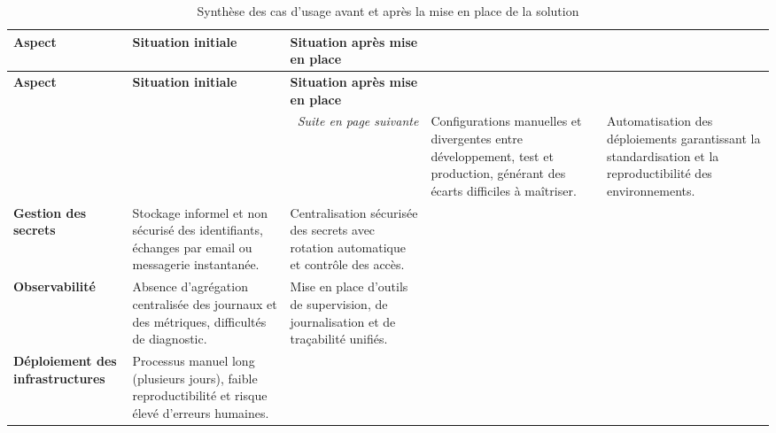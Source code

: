 \begin{longtable}{|p{5cm}|p{5cm}|p{5cm}|}
	\caption{Synthèse des cas d'usage avant et après la mise en place de la solution} \label{tab:avant_apres}                                                                                           \\
	\hline
	\textbf{Aspect}                                                                                                              & \textbf{Situation initiale} & \textbf{Situation après mise en place} \\
	\hline
	\endfirsthead
	\hline
	\textbf{Aspect}                                                                                                              & \textbf{Situation initiale} & \textbf{Situation après mise en place} \\
	\hline
	\endhead
	\hline
	\multicolumn{3}{r}{\textit{Suite en page suivante}}
	\endfoot
	\hline
	\endlastfoot
	\textbf{Cohérence des environnements}                                                                                        &
	Configurations manuelles et divergentes entre développement, test et production, générant des écarts difficiles à maîtriser. &
	Automatisation des déploiements garantissant la standardisation et la reproductibilité des environnements.                                                                                          \\
	\hline
	\textbf{Gestion des secrets}                                                                                                 &
	Stockage informel et non sécurisé des identifiants, échanges par email ou messagerie instantanée.                            &
	Centralisation sécurisée des secrets avec rotation automatique et contrôle des accès.                                                                                                               \\
	\hline
	\textbf{Observabilité}                                                                                                       &
	Absence d’agrégation centralisée des journaux et des métriques, difficultés de diagnostic.                                   &
	Mise en place d’outils de supervision, de journalisation et de traçabilité unifiés.                                                                                                                 \\
	\hline
	\textbf{Déploiement des infrastructures}                                                                                     &
	Processus manuel long (plusieurs jours), faible reproductibilité et risque élevé d’erreurs humaines.                         &

\end{longtable}
